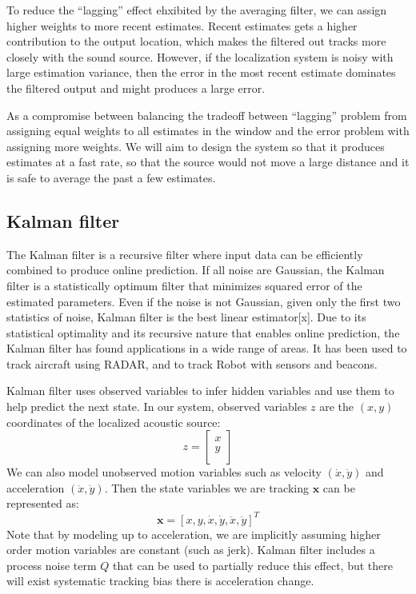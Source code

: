To reduce the ``lagging'' effect ehxibited by the averaging filter, we can assign higher weights to more recent estimates. Recent estimates gets a higher contribution to the output location, which makes the filtered out tracks more closely with the sound source. However, if the localization system is noisy with large estimation variance, then the error in the most recent estimate dominates the filtered output and might produces a large error.

As a compromise between balancing the tradeoff between ``lagging'' problem from assigning equal weights to all estimates in the window and the error problem with assigning more weights. We will aim to design the system so that it produces estimates at a fast rate, so that the source would not move a large distance and it is safe to average the past a few estimates.

\subsection{Kalman filter}
The Kalman filter is a recursive filter where input data can be efficiently combined to produce online prediction. If all noise are Gaussian, the Kalman filter is a statistically optimum filter that minimizes squared error of the estimated parameters. Even if the noise is not Gaussian, given only the first two statistics of noise, Kalman filter is the best linear estimator[x]. Due to its statistical optimality and its recursive nature that enables online prediction, the Kalman filter has found applications in a wide range of areas. It has been used to track aircraft using RADAR, and to track Robot with sensors and beacons.

Kalman filter uses observed variables to infer hidden variables and use them to help predict the next state. In our system, observed variables $z$ are the $(x,y)$ coordinates of the localized acoustic source:
\[
z = \left[\begin{array}{c}
x\\
y\\
\end{array}\right]
\]
We can also model unobserved motion variables such as velocity $(\dot{x}, \dot{y})$ and acceleration $(\ddot{x}, \ddot{y})$. Then the state variables we are tracking $\mathbf{x}$ can be represented as:
\[
\mathbf{x} = \left[x, y, \dot{x}, \dot{y}, \ddot{x}, \ddot{y}\right]^T
\]
Note that by modeling up to acceleration, we are implicitly assuming higher order motion variables are constant (such as jerk). Kalman filter includes a process noise term $Q$ that can be used to partially reduce this effect, but there will exist systematic tracking bias there is acceleration change.

